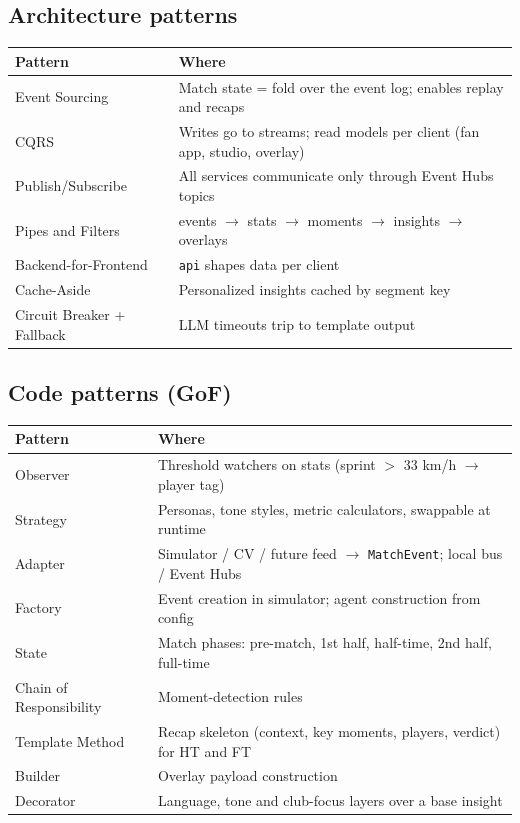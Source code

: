 \documentclass[11pt,a4paper]{article}
\begin{document}
\subsection{Architecture patterns}
\begin{tabularx}{\linewidth}{@{}l Y@{}}
\toprule
Pattern & Where \\
\midrule
Event Sourcing       & Match state = fold over the event log; enables replay and recaps \\
CQRS                 & Writes go to streams; read models per client (fan app, studio, overlay) \\
Publish/Subscribe    & All services communicate only through Event Hubs topics \\
Pipes and Filters    & events $\rightarrow$ stats $\rightarrow$ moments $\rightarrow$ insights $\rightarrow$ overlays \\
Backend-for-Frontend & \texttt{api} shapes data per client \\
Cache-Aside          & Personalized insights cached by segment key \\
Circuit Breaker + Fallback & LLM timeouts trip to template output \\
\bottomrule
\end{tabularx}

\subsection{Code patterns (GoF)}
\begin{tabularx}{\linewidth}{@{}l Y@{}}
\toprule
Pattern & Where \\
\midrule
Observer                & Threshold watchers on stats (sprint $>$ 33 km/h $\rightarrow$ player tag) \\
Strategy                & Personas, tone styles, metric calculators, swappable at runtime \\
Adapter                 & Simulator / CV / future feed $\rightarrow$ \texttt{MatchEvent}; local bus / Event Hubs \\
Factory                 & Event creation in simulator; agent construction from config \\
State                   & Match phases: pre-match, 1st half, half-time, 2nd half, full-time \\
Chain of Responsibility & Moment-detection rules \\
Template Method         & Recap skeleton (context, key moments, players, verdict) for HT and FT \\
Builder                 & Overlay payload construction \\
Decorator               & Language, tone and club-focus layers over a base insight \\
\bottomrule
\end{tabularx}
\end{document}
